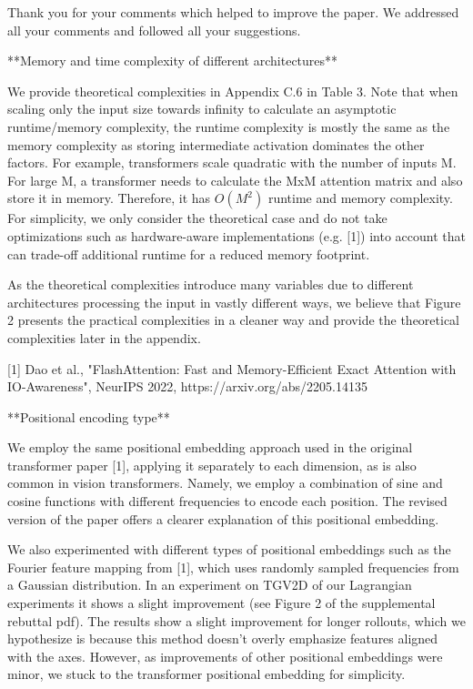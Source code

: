 Thank you for your comments which helped to improve the paper. We addressed all your comments and followed all your suggestions.

**Memory and time complexity of different architectures**


We provide theoretical complexities in Appendix C.6 in Table 3. Note that when scaling only the input size towards infinity to calculate an asymptotic runtime/memory complexity, the runtime complexity is mostly the same as the memory complexity as storing intermediate activation dominates the other factors. For example, transformers scale quadratic with the number of inputs M. For large M, a transformer needs to calculate the MxM attention matrix and also store it in memory. Therefore, it has $O(M^2)$ runtime and memory complexity.
For simplicity, we only consider the theoretical case and do not take optimizations such as hardware-aware implementations (e.g. [1]) into account that can trade-off additional runtime for a reduced memory footprint.

As the theoretical complexities introduce many variables due to different architectures processing the input in vastly different ways, we believe that Figure 2 presents the practical complexities in a cleaner way and provide the theoretical complexities later in the appendix.

[1] Dao et al., "FlashAttention: Fast and Memory-Efficient Exact Attention with IO-Awareness", NeurIPS 2022, https://arxiv.org/abs/2205.14135



**Positional encoding type**



We employ the same positional embedding approach used in the original transformer paper [1], applying it separately to each dimension, as is also common in vision transformers. Namely, we employ a combination of sine and cosine functions with different frequencies to encode each position. The revised version of the paper offers a clearer explanation of this positional embedding.

We also experimented with different types of positional embeddings such as the Fourier feature mapping from [1], which uses randomly sampled frequencies from a Gaussian distribution. In an experiment on TGV2D of our Lagrangian experiments it shows a slight improvement (see Figure 2 of the supplemental rebuttal pdf). The results show a slight improvement for longer rollouts, which we hypothesize is because this method doesn't overly emphasize features aligned with the axes. However, as improvements of other positional embeddings were minor, we stuck to the transformer positional embedding for simplicity.


